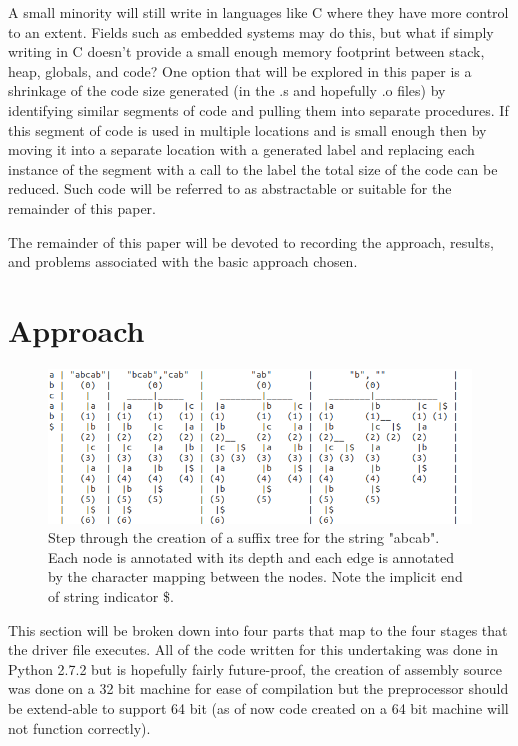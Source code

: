 \documentclass[9pt,nocopyrightspace]{sigplanconf}
\begin{document}
A small minority will still write in languages like C where they have more control to an extent.
Fields such as embedded systems may do this, but what if simply writing in C doesn't provide a small enough memory footprint between stack, heap, globals, and code? One option that will be explored in this paper is a shrinkage of the code size generated (in the .s and hopefully .o files) by identifying similar segments of code and pulling them into separate procedures.
If this segment of code is used in multiple locations and is small enough then by moving it into a separate location with a generated label and replacing each instance of the segment with a call to the label the total size of the code can be reduced.
Such code will be referred to as abstractable or suitable for the remainder of this paper.

The remainder of this paper will be devoted to recording the approach, results, and problems associated with the basic approach chosen.

\section{Approach}

\begin{figure}
\includegraphics[width=\textwidth]{tree_diagram}
\caption{Step through the creation of a suffix tree for the string "abcab". Each node is annotated with its depth and each edge is annotated by the character mapping between the nodes. Note the implicit end of string indicator \$.}
\end{figure}

This section will be broken down into four parts that map to the four stages that the driver file executes.
All of the code written for this undertaking was done in Python 2.7.2 but is hopefully fairly future-proof, the creation of assembly source was done on a 32 bit machine for ease of compilation but the preprocessor should be extend-able to support 64 bit (as of now code created on a 64 bit machine will not function correctly).
\end{document}
